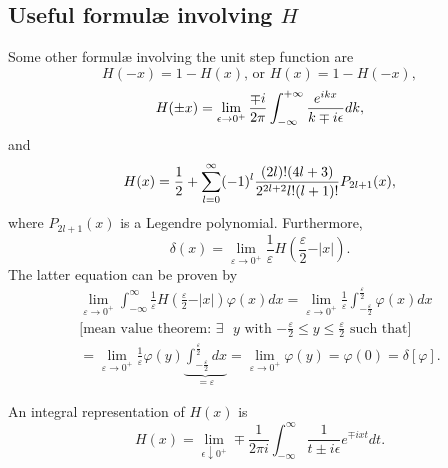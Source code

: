 \subsection{Useful formul\ae{} involving $H$}

Some other formul\ae{}  involving the unit step function
are
 \begin{equation}
H (-x)= 1-H(x)  \text{, or }   H(x) = 1 - H(-x),
 \end{equation}
 \begin{equation}
H (\pm x)=\lim_{\epsilon \rightarrow 0^+}{\mp i\over 2\pi
 }\int_{-\infty}^{+\infty} {e^{ikx}\over k\mp i\epsilon}dk,
 \end{equation}
and
 \begin{equation}
H (x)
={1\over 2}
+
\sum_{l=0}^\infty (-1)^l {(2l)!(4l+3)\over 2^{2l+2}l!(l+1)!}
P_{2l+1} (x),
 \end{equation}
where $P_{2l+1} (x)$ is a Legendre polynomial.
Furthermore,
\begin{equation}
\delta(x)=
\lim_{\varepsilon \rightarrow 0^+}  \frac{1}{\varepsilon } H\left( \frac{\varepsilon }{2} -\vert x\vert\right) .
\end{equation}
{\color{OliveGreen}
\bproof
The latter equation can
be proven by
\begin{equation}
\begin{split}
\lim_{\varepsilon \rightarrow 0^+}  \int_{-\infty}^\infty
\frac{1}{\varepsilon } H\left( \frac{\varepsilon }{2} -\vert x\vert\right) \varphi(x) dx
=
\lim_{\varepsilon \rightarrow 0^+} \frac{1}{\varepsilon } \int_{-\frac{\varepsilon}{2}}^{\frac{\varepsilon}{2}}
\varphi(x) dx
\\
\textrm{[mean value theorem: $\exists$  $y$ with $-\frac{\varepsilon}{2}\le y \le \frac{\varepsilon}{2}$ such that]} \\
=\lim_{\varepsilon \rightarrow 0^+} \frac{1}{\varepsilon }\varphi(y) \underbrace{\int_{-\frac{\varepsilon}{2}}^{\frac{\varepsilon}{2}} dx}_{=\varepsilon }
=\lim_{\varepsilon \rightarrow 0^+}  \varphi(y)  =   \varphi(0) =\delta [\varphi ].
\end{split}
\end{equation}
\eproof
}

An integral representation of $H(x)$ is
 \begin{equation}
H (x)
=\lim_{\epsilon \downarrow 0^+} \mp \frac{1}{2\pi i}
\int_{-\infty}^\infty
 \frac{1}{t \pm i\epsilon}e^{\mp ixt} dt.
 \end{equation}



